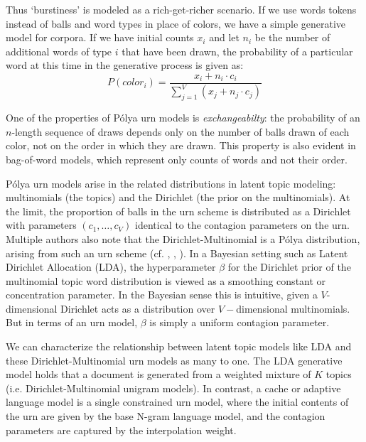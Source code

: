 Thus `burstiness' is modeled as a rich-get-richer scenario.  If we use words tokens instead of balls and word types in place of colors, we have a simple generative model for corpora.  If we have initial counts $x_i$ and let $n_i$ be the number of additional words of type $i$ that have been drawn, the probability of a particular word at this time in the generative process is given as:
\begin{equation}
P(color_i) = \frac{x_i + n_i\cdot c_i}{\sum_{j=1}^V \left (x_j + n_j \cdot c_j\right)}
\label{urn}
\end{equation}

One of the properties of Pólya urn models is \textit{exchangeabilty}: the probability of an $n$-length sequence of draws depends only on the number of balls drawn of each color, not on the order in which they are drawn.  This property is also evident in bag-of-word models, which represent only counts of words and not their order.

Pólya urn models arise in the related distributions in latent topic modeling: multinomials (the topics) and the Dirichlet (the prior on the multinomials).  At the limit, the proportion of balls in the urn scheme is distributed as a Dirichlet with parameters $(c_1,\ldots,c_V)$ identical to the contagion parameters on the urn\cite{blackwell1973}.  Multiple authors also note that the Dirichlet-Multinomial is a Pólya distribution, arising from such an urn scheme (cf. \cite{minka2000estimating}, \cite{madsen2005modeling}, \cite{mimno2011optimizing}).  In a Bayesian setting such as Latent Dirichlet Allocation (LDA), the hyperparameter $\beta$ for the Dirichlet prior of the multinomial topic word distribution is viewed as a smoothing constant or concentration parameter\cite{wallach2006}.  In the Bayesian sense this is intuitive, given a $V$-dimensional Dirichlet acts as a distribution over $V-$dimensional multinomials.  But in terms of an urn model, $\beta$ is simply a uniform contagion parameter.



We can characterize the relationship between latent topic models like LDA and these Dirichlet-Multinomial urn models as many to one.  The LDA generative model holds that a document is generated from a weighted mixture of $K$ topics (i.e. Dirichlet-Multinomial unigram models).  In contrast, a cache or adaptive language model is a single constrained urn model, where the initial contents of the urn are given by the base N-gram language model, and the contagion parameters are captured by the interpolation weight.

